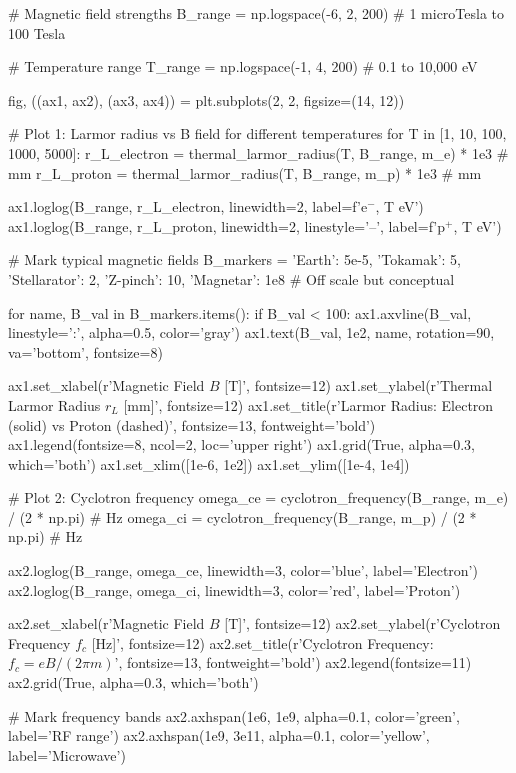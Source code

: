 \documentclass[11pt,a4paper]{article}
\begin{document}
\begin{pycode}
# Magnetic field strengths
B_range = np.logspace(-6, 2, 200)  # 1 microTesla to 100 Tesla

# Temperature range
T_range = np.logspace(-1, 4, 200)  # 0.1 to 10,000 eV

fig, ((ax1, ax2), (ax3, ax4)) = plt.subplots(2, 2, figsize=(14, 12))

# Plot 1: Larmor radius vs B field for different temperatures
for T in [1, 10, 100, 1000, 5000]:
    r_L_electron = thermal_larmor_radius(T, B_range, m_e) * 1e3  # mm
    r_L_proton = thermal_larmor_radius(T, B_range, m_p) * 1e3    # mm

    ax1.loglog(B_range, r_L_electron, linewidth=2, label=f'e$^-$, {T} eV')
    ax1.loglog(B_range, r_L_proton, linewidth=2, linestyle='--', label=f'p$^+$, {T} eV')

# Mark typical magnetic fields
B_markers = {
    'Earth': 5e-5,
    'Tokamak': 5,
    'Stellarator': 2,
    'Z-pinch': 10,
    'Magnetar': 1e8  # Off scale but conceptual
}

for name, B_val in B_markers.items():
    if B_val < 100:
        ax1.axvline(B_val, linestyle=':', alpha=0.5, color='gray')
        ax1.text(B_val, 1e2, name, rotation=90, va='bottom', fontsize=8)

ax1.set_xlabel(r'Magnetic Field $B$ [T]', fontsize=12)
ax1.set_ylabel(r'Thermal Larmor Radius $r_L$ [mm]', fontsize=12)
ax1.set_title(r'Larmor Radius: Electron (solid) vs Proton (dashed)', fontsize=13, fontweight='bold')
ax1.legend(fontsize=8, ncol=2, loc='upper right')
ax1.grid(True, alpha=0.3, which='both')
ax1.set_xlim([1e-6, 1e2])
ax1.set_ylim([1e-4, 1e4])

# Plot 2: Cyclotron frequency
omega_ce = cyclotron_frequency(B_range, m_e) / (2 * np.pi)  # Hz
omega_ci = cyclotron_frequency(B_range, m_p) / (2 * np.pi)  # Hz

ax2.loglog(B_range, omega_ce, linewidth=3, color='blue', label='Electron')
ax2.loglog(B_range, omega_ci, linewidth=3, color='red', label='Proton')

ax2.set_xlabel(r'Magnetic Field $B$ [T]', fontsize=12)
ax2.set_ylabel(r'Cyclotron Frequency $f_c$ [Hz]', fontsize=12)
ax2.set_title(r'Cyclotron Frequency: $f_c = eB/(2\pi m)$', fontsize=13, fontweight='bold')
ax2.legend(fontsize=11)
ax2.grid(True, alpha=0.3, which='both')

# Mark frequency bands
ax2.axhspan(1e6, 1e9, alpha=0.1, color='green', label='RF range')
ax2.axhspan(1e9, 3e11, alpha=0.1, color='yellow', label='Microwave')


\end{pycode}
\end{document}
